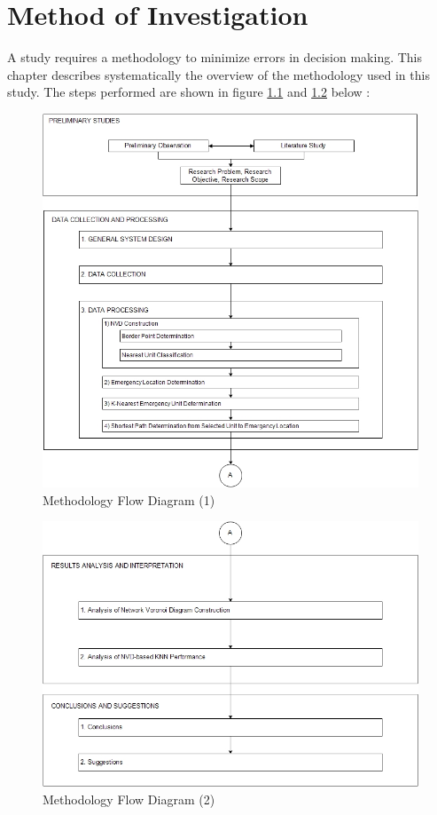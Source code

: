 \chapter{Method of Investigation}
A study requires a methodology to minimize errors in decision making. This chapter describes systematically the overview of the methodology used in this study. The steps performed are shown in figure \ref{fig:research_methodology_flow_diagram_1} and \ref{fig:research_methodology_flow_diagram_2} below :

\begin{figure}[H]
    \centering
    \includegraphics[scale=0.65]{flow_diagram_metodologi_penelitian_1.jpg}
    \caption{Methodology Flow Diagram (1)}
    \label{fig:research_methodology_flow_diagram_1}
\end{figure}

\begin{figure}[H]
    \centering
    \includegraphics[scale=0.65]{flow_diagram_metodologi_penelitian_2.jpg}
    \caption{Methodology Flow Diagram (2)}
    \label{fig:research_methodology_flow_diagram_2}
\end{figure}


